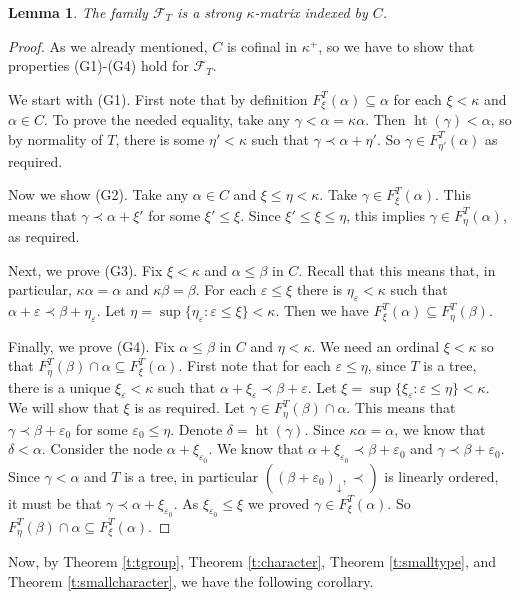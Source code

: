 \documentclass{amsart}
\theoremstyle{plain}
\newtheorem{lemma}[theorem]{Lemma}
\theoremstyle{definition}
\numberwithin{equation}{section}
\renewcommand{\a}{\alpha}
\renewcommand{\b}{\beta}
\newcommand{\g}{\gamma}
\renewcommand{\d}{\delta}
\renewcommand{\k}{\kappa}
\newcommand{\sst}{\subseteq}
\newcommand{\h}{\operatorname{ht}}
\begin{document}
\begin{lemma}\label{l:treematrix}
	The family $\mathcal F_T$ is a strong $\k$-matrix indexed by $C$.
\end{lemma}
\begin{proof}
	As we already mentioned, $C$ is cofinal in $\k^+$, so we have to show that properties (G1)-(G4) hold for $\mathcal F_T$.

	We start with (G1).
	First note that by definition $F^T_{\xi}(\a)\sst\a$ for each $\xi<\k$ and $\a\in C$.
	To prove the needed equality, take any $\g<\a=\k\a$.
	Then $\h(\g)<\a$, so by normality of $T$, there is some $\eta'<\k$ such that $\g\prec\a+\eta'$.
	So $\g\in F^T_{\eta'}(\a)$ as required.

	Now we show (G2).
	Take any $\a\in C$ and $\xi\le\eta<\k$.
	Take $\g\in F^T_{\xi}(\a)$.
	This means that $\g\prec\a+\xi'$ for some $\xi'\le\xi$.
	Since $\xi'\le\xi\le\eta$, this implies $\g\in F^T_{\eta}(\a)$, as required.

	Next, we prove (G3).
	Fix $\xi<\k$ and $\a\le\b$ in $C$.
	Recall that this means that, in particular, $\k\a=\a$ and $\k\b=\b$.
	For each $\varepsilon \le \xi$ there is $\eta_{\varepsilon} < \k$ such that $\a+\varepsilon\prec\b+\eta_{\varepsilon}$.
	Let $\eta = \sup\{\eta_{\varepsilon} : \varepsilon \le \xi\} < \k$.
	Then we have $F^T_{\xi}(\a)\sst F^T_{\eta}(\b)$.

	Finally, we prove (G4).
	Fix $\a\le\b$ in $C$ and $\eta<\k$.
	We need an ordinal $\xi<\k$ so that $F^T_{\eta}(\b)\cap \a\sst F^T_{\xi}(\a)$.
	First note that for each $\varepsilon \le \eta$, since $T$ is a tree, there is a unique $\xi_{\varepsilon} < \k$ such that $\a+\xi_{\varepsilon} \prec \b+\varepsilon$.
	Let $\xi = \sup\{\xi_{\varepsilon} : \varepsilon \le \eta\} < \k$.
	We will show that $\xi$ is as required.
	Let $\g\in F^T_{\eta}(\b)\cap \a$.
	This means that $\g\prec\b+\varepsilon_0$ for some $\varepsilon_0\le\eta$.
	Denote $\d=\h(\g)$.
	Since $\k\a=\a$, we know that $\d<\a$.
	Consider the node $\a+\xi_{\varepsilon_0}$.
	We know that $\a+\xi_{\varepsilon_0}\prec \b+\varepsilon_0$ and $\g\prec \b+\varepsilon_0$.
	Since $\g<\a$ and $T$ is a tree, in particular $((\b+\varepsilon_0)_{\downarrow},\prec)$ is linearly ordered, it must be that $\g\prec\a+\xi_{\varepsilon_0}$.
	As $\xi_{\varepsilon_0}\le\xi$ we proved $\g\in F^T_{\xi}(\a)$. 
	So $F^T_{\eta}(\b)\cap\a\sst F^T_{\xi}(\a)$.
\end{proof}

Now, by Theorem \ref{t:tgroup}, Theorem \ref{t:character}, Theorem \ref{t:smalltype}, and Theorem \ref{t:smallcharacter}, we have the following corollary. 
\end{document}
